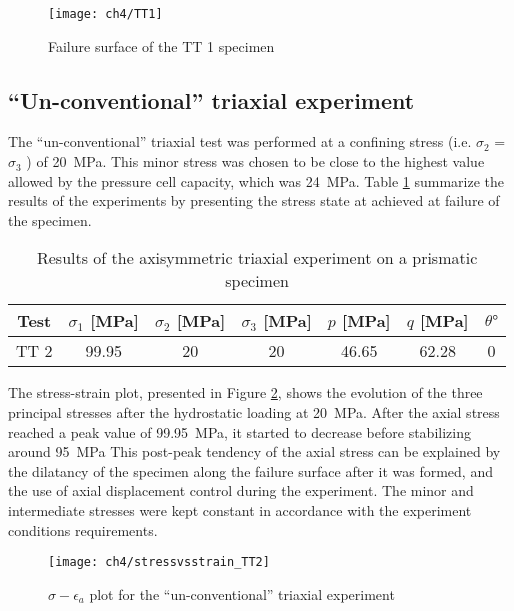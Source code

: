\begin{figure}[tb]
    \centering
    \texttt{[image: ch4/TT1]}
    \caption{Failure surface of the TT 1 specimen}
    \label{fig4:12}
\end{figure} 

\subsection{“Un-conventional” triaxial experiment }

The “un-conventional” triaxial test was performed at a confining stress (i.e. $\sigma_2$ = $\sigma_3$ ) of \SI{20}{MPa}. This minor stress was chosen to be close to the highest value allowed by the pressure cell capacity, which was \SI{24}{MPa}. Table \ref{tb4:TT2} summarize the results of the experiments by presenting the stress state at achieved at failure of the specimen. 

\begin{table}
    \centering
    \begin{tabular}{ccccccc}
        \hline
        Test & $\sigma_1$ [\si{MPa}] & $\sigma_2$ [\si{MPa}] & $\sigma_3$ [\si{MPa}] & $p$ [\si{MPa}] & $q$ [\si{MPa}] & $\theta \si{\degree}$ \\
        \hline
        \hline
        TT 2 & 99.95 & 20 & 20 & 46.65 & 62.28 & 0\\
        \hline
    \end{tabular}
    \caption{Results of the axisymmetric triaxial experiment on a prismatic specimen}
    \label{tb4:TT2}
\end{table}

The stress-strain plot, presented in Figure \ref{fig4:13}, shows the evolution of the three principal stresses after the hydrostatic loading at \SI{20}{MPa}. After the axial stress reached a peak value of \SI{99.95}{MPa}, it started to decrease before stabilizing around \SI{95}{MPa} This post-peak tendency of the axial stress can be explained by the dilatancy of the specimen along the failure surface after it was formed, and the use of axial displacement control during the experiment. The minor and intermediate stresses were kept constant in accordance with the experiment conditions requirements.

\begin{figure}[tb]
    \centering
    \texttt{[image: ch4/stressvsstrain\_TT2]}
    \caption{$\sigma - \epsilon_a$ plot for the “un-conventional” triaxial experiment}
    \label{fig4:13}
\end{figure} 


